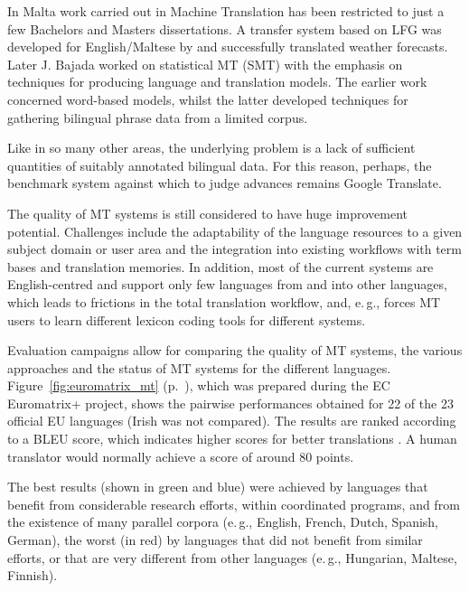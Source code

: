 \documentclass[]{../../metanetpaper}
\begin{document}
\begin{multicols}{2}

In Malta work carried out in Machine Translation has been restricted to just a few Bachelors and Masters dissertations. A transfer system based on LFG was developed for English/Maltese by \cite{Farrugia:2000} and successfully translated weather forecasts. Later J. Bajada \cite{Bajada:2004, Bajada:2009} worked on statistical MT (SMT) with the emphasis on techniques for producing language and translation models. The earlier work concerned word-based models, whilst the latter developed techniques for gathering bilingual phrase data from a limited corpus.

Like in so many other areas, the underlying problem is a lack of sufficient quantities of suitably annotated bilingual data. For this reason, perhaps, the benchmark system against which to judge advances remains Google Translate.

The quality of MT systems is still considered to have huge improvement potential. Challenges include the adaptability of the language resources to a given subject domain or user area and the integration into existing workflows with term bases and translation memories. In addition, most of the current systems are English-centred and support only few languages from and into other languages, which leads to frictions in the total translation workflow, and, e.\,g., forces MT users to learn different lexicon coding tools for different systems.

Evaluation campaigns allow for comparing the quality of MT systems, the various approaches and the status of MT systems for the different languages. Figure~\ref{fig:euromatrix_mt} (p.~\pageref{fig:euromatrix_mt}), which was prepared during the EC Euromatrix+ project, shows the pairwise performances obtained for 22 of the 23 official EU languages (Irish was not compared). The results are ranked according to a BLEU score, which indicates higher scores for better translations \cite{bleu1}. A human translator would normally achieve a score of around 80 points.

The best results (shown in green and blue) were achieved by languages that benefit from considerable research efforts, within coordinated programs, and from the existence of many parallel corpora (e.\,g., English, French, Dutch, Spanish, German), the worst (in red) by languages that did not benefit from similar efforts, or that are very different from other languages (e.\,g., Hungarian, Maltese, Finnish).


\end{multicols}
\end{document}
